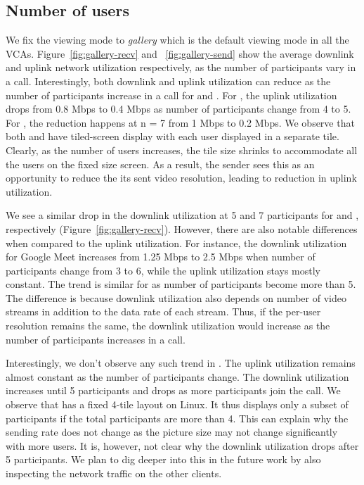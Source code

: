 \subsection{Number of users}
We fix the viewing mode to \textit{gallery} which is the default viewing mode in all the VCAs. Figure~\ref{fig:gallery-recv} and~
\ref{fig:gallery-send} show the average downlink and uplink network utilization respectively, as the number of participants vary in a call. Interestingly, both downlink and uplink utilization can reduce as the number of participants increase in a call for \meet and \zoom. For \zoom, the uplink utilization drops from 0.8 Mbps to 0.4 Mbps as number of participants change from 4 to 5. For \meet, the reduction happens at n = 7 from 1 Mbps to  0.2 Mbps. We observe that both \meet and \zoom have tiled-screen display with each user displayed in a separate tile. Clearly, as the number of users increases, the tile size shrinks to accommodate all the users on the fixed size screen. As a result, the sender sees this as an opportunity to reduce the its sent video resolution, leading to reduction in uplink utilization.


We see a similar drop in the downlink utilization at 5 and 7 participants for \zoom and \meet, respectively (Figure~\ref{fig:gallery-recv}). However, there are also notable differences when compared to the uplink utilization. For instance, the downlink utilization for Google Meet increases from 1.25 Mbps to 2.5 Mbps when number of participants change from 3 to 6, while the uplink utilization stays mostly constant. The trend is similar for \zoom as number of participants become more than 5. The difference is because downlink utilization also depends on number of video streams in addition to the data rate of each stream. Thus, if the per-user resolution remains the same, the downlink utilization would increase as the number of participants increases in a call. 

Interestingly, we don't observe any such trend in \teams. The uplink utilization remains almost constant as the number of participants change. The downlink utilization increases until 5 participants and drops as more participants join the call. We observe that \teams has a fixed 4-tile layout on Linux. It thus displays only a subset of participants if the total participants are more than 4. This can explain why the sending rate does not change as the picture size may not change significantly with more users. It is, however, not clear why the downlink utilization drops after 5 participants. We plan to dig deeper into this in the future work by also inspecting the network traffic on the other clients. 
 



